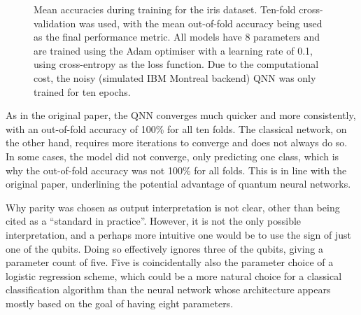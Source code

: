 \begin{figure}
    \centering
    \caption{
        Mean accuracies during training for the iris dataset.
        Ten-fold cross-validation was used, with the mean out-of-fold accuracy being used as the final performance metric.
        All models have 8 parameters and are trained using the Adam optimiser with a learning rate of 0.1, using cross-entropy as the loss function.
        Due to the computational cost, the noisy (simulated IBM Montreal backend) QNN was only trained for ten epochs.
    }
    \label{fig:iris_training}
\end{figure}


As in the original paper, the QNN converges much quicker and more consistently, with an out-of-fold accuracy of 100\% for all ten folds.
The classical network, on the other hand, requires more iterations to converge and does not always do so.
In some cases, the model did not converge, only predicting one class, which is why the out-of-fold accuracy was not 100\% for all folds.
This is in line with the original paper, underlining the potential advantage of quantum neural networks.

Why parity was chosen as output interpretation is not clear, other than being cited as a \enquote{standard in practice}.
However, it is not the only possible interpretation, and a perhaps more intuitive one would be to use the sign of just one of the qubits.
Doing so effectively ignores three of the qubits, giving a parameter count of five.
Five is coincidentally also the parameter choice of a logistic regression scheme, which could be a more natural choice for a classical classification algorithm than the neural network whose architecture appears mostly based on the goal of having eight parameters.

